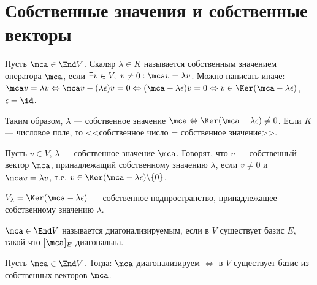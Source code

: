 \documentclass[main]{subfiles}
\begin{document}
\chapter{Собственные значения и собственные векторы}

Пусть $\mca \in \End V$. Скаляр $\lambda \in K$ называется собственным значением оператора
$\mca$, если $\exists v \in V,\ v \neq 0 : \mca v = \lambda v$.
Можно написать иначе: $\mca v = \lambda v \Leftrightarrow \mca v - (\lambda \epsilon) v = 0
\Leftrightarrow (\mca -\lambda\epsilon)v = 0 
\Leftrightarrow v \in \Ker(\mca -\lambda\epsilon)$, $\epsilon = \id$.

\begin{definition}
    Таким образом, $\lambda$  —  собственное значение $\mca 
    \Leftrightarrow  \Ker(\mca -\lambda\epsilon) \neq 0$. 
    Если $K$ — числовое поле, то <<собственное число = собственное значение>>.
\end{definition}

\begin{definition}
    Пусть $v \in V$, $\lambda$ — собственное значение $\mca$. 
    Говорят, что $v$ — собственный вектор $\mca$, принадлежащий собственному значению
    $\lambda$, если $v \neq 0$ и $\mca v = \lambda v$,
    т.е. $v \in \Ker (\mca - \lambda \epsilon) \backslash  \{0\}$.
\end{definition}

\begin{definition}
    $V_\lambda = \Ker(\mca - \lambda \epsilon)$ —  
    собственное подпространство, принадлежащее собственному значению $\lambda$.    
\end{definition}

\begin{definition}
    $\mca  \in \End V$ называется диагонализируемым, если в $V$ существует 
    базис $E$, такой что $[\mca]_E$ диагональна.
\end{definition}
 
\begin{proposition}
    Пусть $\mca \in \End V$. Тогда: $\mca$ диагонализируем 
    $\Leftrightarrow$ в $V$ существует базис из собственных векторов $\mca$.
\end{proposition}
 
\end{document}
